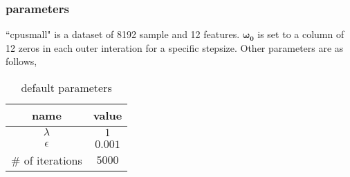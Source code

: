 \documentclass[a4paper,11pt]{article}
\begin{document}
\subsubsection*{parameters}
``cpusmall" is a dataset of 8192 sample and 12 features. $\bm{\omega_{0}}$ is set to a column of 12 zeros in each outer interation for a specific stepsize. Other parameters are as follows,\\
\begin{table}[H]
	\begin{center}
		\caption{default parameters}
		\begin{tabular}{cc}
			\toprule[2pt]
			name &	value  \\ 
			\hline 
			$\lambda$ &	$1$  \\ 
			$\epsilon$ & $0.001$  \\ 
			$\#$ of iterations & $5000$  \\ 
			\bottomrule[2pt]
		\end{tabular} 
	\end{center}
\end{table}
\par
\end{document}
